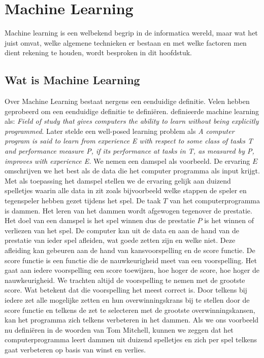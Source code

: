 
\chapter{Machine Learning}\label{Machine Learning}

Machine learning is een welbekend begrip in de informatica wereld, maar wat het juist omvat, welke algemene technieken er bestaan en met welke factoren men dient rekening te houden, wordt besproken in dit hoofdstuk.

\section{Wat is Machine Learning}\label{Wat is Machine Learning}

Over Machine Learning bestaat nergens een eenduidige definitie. Velen hebben geprobeerd om een eenduidige definitie te defini\"eren. \citet{samuel2000some} definieerde machine learning als:
\newline
\newline
\textit{Field of study that gives computers the ability to learn without being explicitly programmed}.
\newline
\newline
Later stelde \citet{mitchell1997machine} een well-posed learning problem als 
\newline
\newline
\textit{A computer program is said to learn from experience E with respect to some class of tasks T and performance measure P, if its performance at tasks in T, as measured by P, improves with experience E.}
\newline
\newline
%
We nemen een damspel als voorbeeld. De ervaring $E$ omschrijven we het best als de data die het computer programma als input krijgt. Met als toepassing het damspel stellen we de ervaring gelijk aan duizend spelletjes waarin alle data in zit zoals bijvoorbeeld welke stappen de speler en tegenspeler hebben gezet tijdens het spel. De taak $T$ van het computerprogramma is dammen. Het leren van het dammen wordt afgewogen tegenover de prestatie. Het doel van een damspel is het spel winnen dus de prestatie $P$ is het winnen of verliezen van het spel. De computer kan uit de data en aan de hand van de prestatie van ieder spel afleiden, wat goede zetten zijn en welke niet. Deze afleiding kan gebeuren aan de hand van kansvoorspelling en de score functie. De score functie is een functie die de nauwkeurigheid meet van een voorspelling. Het gaat aan iedere voorspelling een score toewijzen, hoe hoger de score, hoe hoger de nauwkeurigheid. We trachten altijd  de voorspelling te nemen met de grootste score. Wat betekent dat die voorspelling het meest correct is. Door telkens bij iedere zet alle mogelijke zetten en hun overwinningskrans bij te stellen door de score functie en telkens de zet te selecteren met de grootste overwinningskansen, kan het programma zich telkens verbeteren in het dammen. Als we ons voorbeeld nu defini\"eren in de woorden van Tom Mitchell, kunnen we zeggen dat het computerprogramma leert dammen uit duizend spelletjes en zich per spel telkens gaat verbeteren op basis van winst en verlies.\\    

